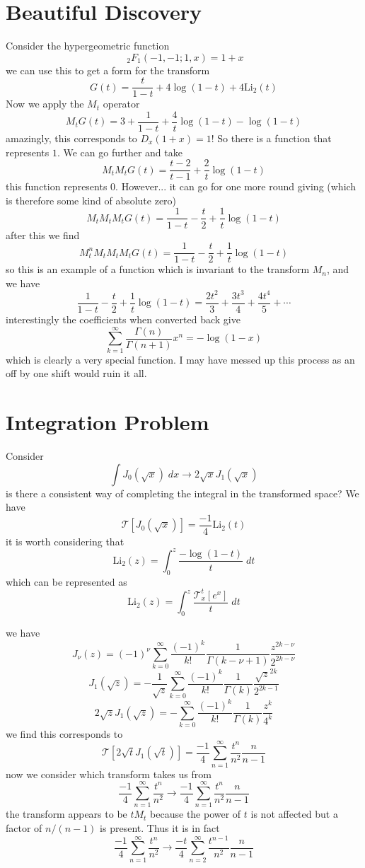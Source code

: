 \documentclass{article}
\begin{document}
\section{Beautiful Discovery}
Consider the hypergeometric function 
$$
\;_2F_1(-1,-1;1,x) = 1+x
$$
we can use this to get a form for the transform 
$$
G(t) = \frac{t}{1-t} + 4 \log(1-t) + 4 \mathrm{Li}_2(t)
$$
Now we apply the $M_t$ operator
$$
M_t G(t) = 3 + \frac{1}{1-t} + \frac{4}{t}\log(1-t) - \log(1-t)
$$
amazingly, this corresponds to $D_x(1+x) = 1$! So there is a function that represents $1$.
We can go further and take 
$$
M_t M_t G(t) = \frac{t-2}{t-1} + \frac{2}{t}\log(1-t)
$$
this function represents $0$. However... it can go for one more round giving (which is therefore some kind of absolute zero)
$$
M_t M_t M_t G(t) = \frac{1}{1-t} - \frac{t}{2} + \frac{1}{t}\log(1-t)
$$
after this we find 
$$
M_t^n M_t M_t M_t G(t) = \frac{1}{1-t} - \frac{t}{2} + \frac{1}{t}\log(1-t)
$$
so this is an example of a function which is invariant to the transform $M_n$, and we have 
$$
\frac{1}{1-t} - \frac{t}{2} + \frac{1}{t}\log(1-t) = \frac{2 t^2}{3} + \frac{3 t^3}{4} + \frac{4 t^4}{5} + \cdots
$$
interestingly the coefficients when converted back give
$$
\sum_{k=1}^\infty \frac{\Gamma(n)}{\Gamma(n+1)} x^n = - \log(1-x)
$$
which is clearly a very special function. I may have messed up this process as an off by one shift would ruin it all.


\section{Integration Problem}

Consider 
$$
\int J_0(\sqrt{x}) \; dx \to 2 \sqrt{x} J_1(\sqrt{x})
$$
is there a consistent way of completing the integral in the transformed space?
We have 
$$
\mathcal{T}[J_0(\sqrt{x})] = \frac{-1}{4}\mathrm{Li}_2(t)
$$
it is worth considering that 
$$
\mathrm{Li}_2(z) = \int_0^z \frac{- \log(1-t)}{t} \; dt
$$
which can be represented as 
$$
\mathrm{Li}_2(z) = \int_0^z \frac{\mathcal{T}_x^t[e^x]}{t} \; dt
$$

we have 
$$
J_\nu(z) = (-1)^\nu \sum_{k=0}^\infty \frac{(-1)^k}{k!} \frac{1}{\Gamma(k-\nu+1)}\frac{z^{2k-\nu}}{2^{2k-\nu}}
$$
$$
J_1(\sqrt{z}) = - \frac{1}{\sqrt{z}}\sum_{k=0}^\infty \frac{(-1)^k}{k!} \frac{1}{\Gamma(k)}\frac{\sqrt{z}^{2k}}{2^{2k-1}}
$$
$$
2 \sqrt{z} J_1(\sqrt{z}) = -\sum_{k=0}^\infty \frac{(-1)^k}{k!} \frac{1}{\Gamma(k)}\frac{z^k}{4^{k}}
$$
we find this corresponds to 
$$
\mathcal{T}[2\sqrt{t}J_1(\sqrt{t})] =  \frac{-1}{4}\sum_{n=1}^\infty \frac{t^n}{n^2}\frac{n}{n-1}
$$
now we consider which transform takes us from 
$$
\frac{-1}{4} \sum_{n=1}^\infty \frac{t^n}{n^2} \to \frac{-1}{4} \sum_{n=1}^\infty \frac{t^n}{n^2} \frac{n}{n-1}
$$
the transform appears to be $t M_t$ because the power of $t$ is not affected but a factor of $n/(n-1)$ is present. Thus it is in fact
$$
\frac{-1}{4} \sum_{n=1}^\infty \frac{t^n}{n^2} \to \frac{-t}{4} \sum_{n=2}^\infty \frac{t^{n-1}}{n^2} \frac{n}{n-1}
$$
\end{document}
